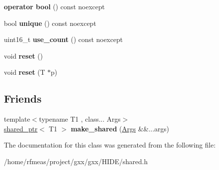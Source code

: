 \begin{DoxyCompactItemize}
\item 
{\bfseries operator bool} () const noexcept\hypertarget{classgxx_1_1shared__ptr_a0ab32e6f9cf56f1e00700a47d9efe149}{}\label{classgxx_1_1shared__ptr_a0ab32e6f9cf56f1e00700a47d9efe149}

\item 
bool {\bfseries unique} () const noexcept\hypertarget{classgxx_1_1shared__ptr_ab52d69e42cc00d5a08d347c44ab27aa6}{}\label{classgxx_1_1shared__ptr_ab52d69e42cc00d5a08d347c44ab27aa6}

\item 
uint16\+\_\+t {\bfseries use\+\_\+count} () const noexcept\hypertarget{classgxx_1_1shared__ptr_ad37c4206655ddff1f3d9917a7f657895}{}\label{classgxx_1_1shared__ptr_ad37c4206655ddff1f3d9917a7f657895}

\item 
void {\bfseries reset} ()\hypertarget{classgxx_1_1shared__ptr_a1975cb03eecbc4f2490de93310f429ed}{}\label{classgxx_1_1shared__ptr_a1975cb03eecbc4f2490de93310f429ed}

\item 
void {\bfseries reset} (T $\ast$p)\hypertarget{classgxx_1_1shared__ptr_afbff36d11c75e0630dc18cfe14e175eb}{}\label{classgxx_1_1shared__ptr_afbff36d11c75e0630dc18cfe14e175eb}

\end{DoxyCompactItemize}
\subsection*{Friends}
\begin{DoxyCompactItemize}
\item 
{\footnotesize template$<$typename T1 , class... Args$>$ }\\\hyperlink{classgxx_1_1shared__ptr}{shared\+\_\+ptr}$<$ T1 $>$ {\bfseries make\+\_\+shared} (\hyperlink{structArgs}{Args} \&\&...args)\hypertarget{classgxx_1_1shared__ptr_a45c580c1ecee929034fb5c2a5cfb7d13}{}\label{classgxx_1_1shared__ptr_a45c580c1ecee929034fb5c2a5cfb7d13}

\end{DoxyCompactItemize}


The documentation for this class was generated from the following file\+:\begin{DoxyCompactItemize}
\item 
/home/rfmeas/project/gxx/gxx/\+H\+I\+D\+E/shared.\+h\end{DoxyCompactItemize}
